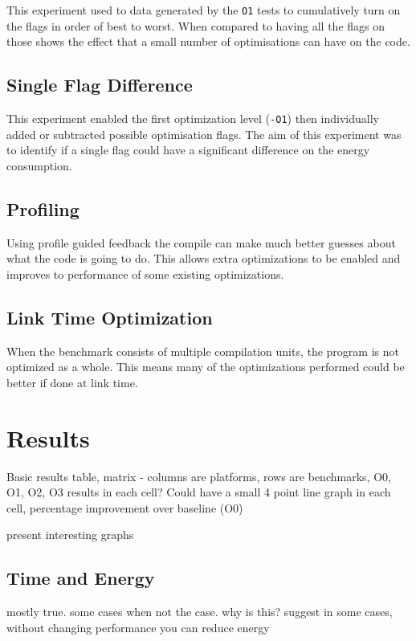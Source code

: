 \documentclass[twocolumn]{article}
\begin{document}
This experiment used to data generated by the \texttt{O1} tests to cumulatively turn on the flags in order of best to worst. When compared to having all the flags on those shows the effect that a small number of optimisations can have on the code.

\subsection*{Single Flag Difference}

This experiment enabled the first optimization level (\texttt{-O1}) then individually added or subtracted possible optimisation flags. The aim of this experiment was to identify if a single flag could have a significant difference on the energy consumption.

\subsection*{Profiling}

Using profile guided feedback the compile can make much better guesses about what the code is going to do. This allows extra optimizations to be enabled and improves to performance of some existing optimizations.

\subsection*{Link Time Optimization}

When the benchmark consists of multiple compilation units, the program is not optimized as a whole. This means many of the optimizations performed could be better if done at link time.

\section*{Results}

Basic results table, matrix - columns are platforms, rows are benchmarks, O0, O1, O2, O3 results in each cell?
Could have a small 4 point line graph in each cell, percentage improvement over baseline (O0)

present interesting graphs

\subsection*{Time and Energy}

mostly true.
some cases when not the case. why is this?
suggest in some cases, without changing performance you can reduce energy
\end{document}
